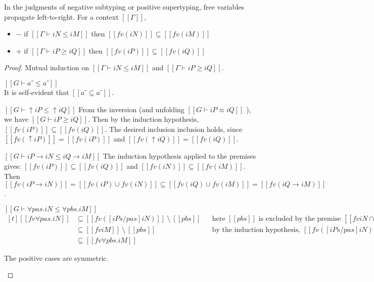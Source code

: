 
\begin{lemma}
  \label{lemma:fv-propagation}
  In the judgments of negative subtyping or positive supertyping,
  free variables propagate left-to-right. For a context $[[Γ]]$,
  \begin{itemize}
    \item $-$ if $[[Γ ⊢ iN ≤ iM]]$ then $[[fv(iN)]] \subseteq [[fv(iM)]]$
    \item $+$ if $[[Γ ⊢ iP ≥ iQ]]$ then $[[fv(iP)]] \subseteq [[fv(iQ)]]$
  \end{itemize}
\end{lemma}
\begin{proof}
  Mutual induction on $[[Γ ⊢ iN ≤ iM]]$ and $[[Γ ⊢ iP ≥ iQ]]$.
  \begin{caseof}
  \item $[[G ⊢ a⁻ ≤ a⁻]]$\\
    It is self-evident that $[[{a⁻} ⊆ {a⁻}]]$.
  \item $[[G ⊢ ↑iP ≤ ↑iQ]]$
    From the inversion (and unfolding $[[G ⊢ iP ≈ iQ]]$ ), we have
    $[[G ⊢ iP ≥ iQ]]$. Then by the induction hypothesis,
    $[[fv(iP)]] \subseteq [[fv(iQ)]]$. The desired inclusion
    inclusion holds, since $[[fv(↑iP)]] = [[fv(iP)]]$ and
    $[[fv(↑iQ)]] = [[fv(iQ)]]$.
  \item $[[G ⊢ iP → iN ≤ iQ → iM]]$
    The induction hypothesis applied to the premises gives:
    $[[fv(iP)]] \subseteq [[fv(iQ)]]$ and
    $[[fv(iN)]] \subseteq [[fv(iM)]]$.
    Then $[[fv(iP → iN)]] = [[fv(iP) ∪ fv(iN)]] \subseteq
    [[fv(iQ) ∪ fv(iM)]] = [[fv(iQ → iM)]]$.

  \item $[[G ⊢ ∀pas.iN ≤ ∀pbs.iM]]$\\
    $
    \begin{aligned}[t]
      [[fv ∀pas.iN ]] &\subseteq [[fv ([iPs/pas] iN) ]] ~\setminus~ [[{pbs}]] 
                      &&   \text{here $[[{pbs}]]$ is excluded by the premise $[[fv iN ∩ {pbs} = ∅]]$}\\
                      &\subseteq [[fv iM]] ~\setminus~ [[{pbs}]]
                      &&   \text{by the induction hypothesis, } [[fv ([iPs/pas] iN) ]] \subseteq [[fv iM]] \\
                      &\subseteq [[fv ∀pbs.iM]]
    \end{aligned}
    $
  \item The positive cases are symmetric.
  \end{caseof}
\end{proof}

